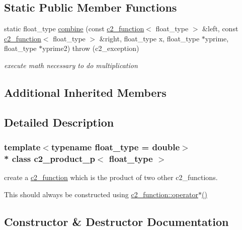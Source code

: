\subsection*{Static Public Member Functions}
\begin{DoxyCompactItemize}
\item 
static float\+\_\+type \hyperlink{classc2__product__p_a35c37539a7ebc7074d5780a912dcb1d5}{combine} (const \hyperlink{classc2__function}{c2\+\_\+function}$<$ float\+\_\+type $>$ \&left, const \hyperlink{classc2__function}{c2\+\_\+function}$<$ float\+\_\+type $>$ \&right, float\+\_\+type x, float\+\_\+type $\ast$yprime, float\+\_\+type $\ast$yprime2)  throw (c2\+\_\+exception)
\begin{DoxyCompactList}\small\item\em execute math necessary to do multiplication \end{DoxyCompactList}\end{DoxyCompactItemize}
\subsection*{Additional Inherited Members}


\subsection{Detailed Description}
\subsubsection*{template$<$typename float\+\_\+type = double$>$\\*
class c2\+\_\+product\+\_\+p$<$ float\+\_\+type $>$}

create a \hyperlink{classc2__function}{c2\+\_\+function} which is the product of two other c2\+\_\+functions.

This should always be constructed using \hyperlink{classc2__function_a7744675c98a8ec63320ac1c0b61bec9c}{c2\+\_\+function\+::operator$\ast$()} 

\subsection{Constructor \& Destructor Documentation}
